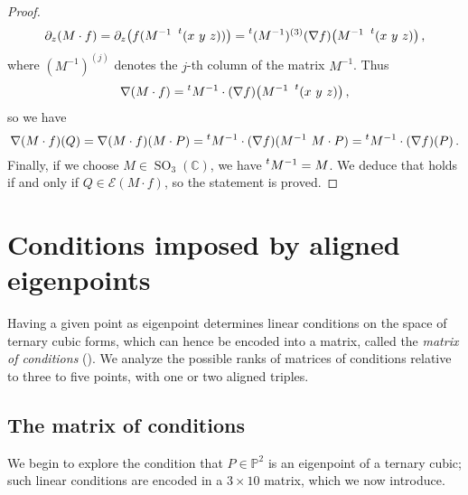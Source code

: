 \documentclass[a4paper, 11pt, reqno]{amsart}
\theoremstyle{plain}
\theoremstyle{definition}
\newcommand{\C}{\mathbb{C}}
\newcommand{\p}{\mathbb{P}}
\newcommand{\SO}{\operatorname{SO}}
\newcommand{\Eig}[1]{\mathcal{E}\!\left( {#1} \right)}
\begin{document}
\begin{proof}
\begin{gather*}
  \partial_z (M\cdot f) = \partial_z \bigl( f(M^{-1} \ \prescript{t} {} (x \ y \ z)) \bigr) = \prescript{t} {}(M^{-1})^{(3)}(\nabla f) \bigl( M^{-1}\ \prescript{t} {} (x \ y \ z) \bigr) \,,
\end{gather*}
%
where $(M^{-1})^{(j)}$ denotes the $j$-th column of the matrix $M^{-1}$. Thus
%
\[
  \nabla (M \cdot f) = \prescript{t} {} M^{-1} \cdot (\nabla f) \bigl(M^{-1}\ \prescript{t} {} (x \ y \ z)\bigr) \,,
\]
%
so we have
%
\[
  \nabla (M \cdot f)(Q)=\nabla (M \cdot f)(M \cdot P)=
  \prescript{t} {} M^{-1} \cdot (\nabla f) (M^{-1}\ M \cdot P)=\prescript{t} {} M^{-1} \cdot (\nabla f)(P) \,.
\]
%
Finally, if we choose $M \in \SO_3(\C)$, we have
$\prescript{t} {} M^{-1}=M$. We deduce that
 holds if and only if $Q \in \Eig{M\cdot f}$, so the statement is proved.
\end{proof}


\section{Conditions imposed by aligned eigenpoints}
\label{conditions}

Having a given point as eigenpoint determines linear conditions on the space of ternary cubic forms,
which can hence be encoded into a matrix, called the \emph{matrix of conditions} ().
We analyze the possible ranks of matrices of conditions relative to three to five points, with one or two aligned triples.


\subsection{The matrix of conditions}

We begin to explore the condition that $P\in \p^2$ is an eigenpoint of a ternary cubic; such linear conditions are encoded in
a $3 \times 10$ matrix, which we now introduce.
\end{document}
